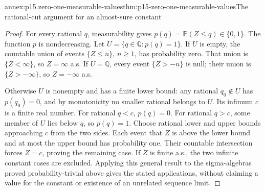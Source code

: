 \begin{annexitem}{annex:p15.zero-one-measurable-values}{thm:p15-zero-one-measurable-values}{The rational-cut argument for an almost-sure constant}
\begin{proof}
For every rational \(q\), measurability gives
\(p(q)=\mathbb P(Z\leq q)\in\{0,1\}\).
The function \(p\) is nondecreasing. Let
\(U=\{q\in\mathbb Q:p(q)=1\}\).
If \(U\) is empty, the countable union of events
\(\{Z\leq n\}\), \(n\geq1\), has probability zero.
That union is \(\{Z<\infty\}\), so \(Z=\infty\) a.s.
If \(U=\mathbb Q\), every event \(\{Z>-n\}\) is null;
their union is \(\{Z>-\infty\}\), so \(Z=-\infty\) a.s.

Otherwise \(U\) is nonempty and has a finite lower bound:
any rational \(q_0\notin U\) has \(p(q_0)=0\), and by
monotonicity no smaller rational belongs to \(U\).
Its infimum \(c\) is a finite real number. For rational
\(q<c\), \(p(q)=0\). For rational \(q>c\), some member
of \(U\) lies below \(q\), so \(p(q)=1\).
Choose rational lower and upper bounds approaching \(c\)
from the two sides. Each event that \(Z\) is above the
lower bound and at most the upper bound has probability one.
Their countable intersection forces \(Z=c\), proving the
remaining case. If \(Z\) is finite a.s., the two infinite
constant cases are excluded. Applying this general result to
the sigma-algebras proved probability-trivial above gives the
stated applications, without claiming a value for the constant
or existence of an unrelated sequence limit.
\end{proof}
\end{annexitem}

